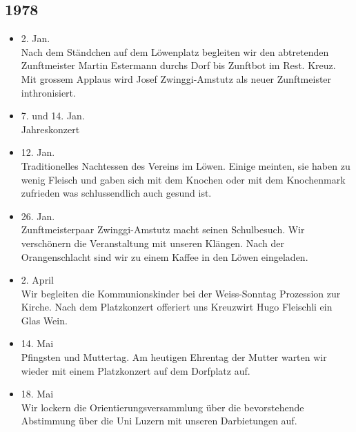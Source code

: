\subsection{1978}

\begin{history}


    \begin{itemize}

        \item 2. Jan.\\
              Nach dem Ständchen auf dem Löwenplatz begleiten wir den abtretenden
              Zunftmeister Martin Estermann durchs Dorf bis Zunftbot im Rest. Kreuz.
              Mit grossem Applaus wird Josef Zwinggi-Amstutz als neuer Zunftmeister
              inthronisiert.

        \item 7. und 14. Jan.\\
              Jahreskonzert

        \item 12. Jan.\\
              Traditionelles Nachtessen des Vereins im Löwen. Einige meinten, sie
              haben zu wenig Fleisch und gaben sich mit dem Knochen oder mit dem
              Knochenmark zufrieden was schlussendlich auch gesund ist.

        \item 26. Jan.\\
              Zunftmeisterpaar Zwinggi-Amstutz macht seinen Schulbesuch. Wir
              verschönern die Veranstaltung mit unseren Klängen. Nach der
              Orangenschlacht sind wir zu einem Kaffee in den Löwen eingeladen.

        \item 2. April\\
              Wir begleiten die Kommunionskinder bei der Weiss-Sonntag Prozession zur
              Kirche. Nach dem Platzkonzert offeriert uns Kreuzwirt Hugo Fleischli ein
              Glas Wein.

        \item 14. Mai\\
              Pfingsten und Muttertag. Am heutigen Ehrentag der Mutter warten wir
              wieder mit einem Platzkonzert auf dem Dorfplatz auf.

        \item 18. Mai\\
              Wir lockern die Orientierungsversammlung über die bevorstehende
              Abstimmung über die Uni Luzern mit unseren Darbietungen auf.


\end{itemize}
\end{history}
